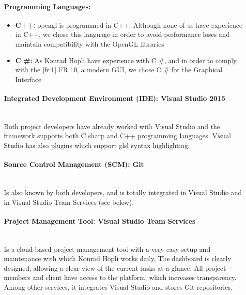\paragraph{Programming Languages:}
\begin{itemize}
	\item[] \textbf{C++:} \gls{opengl} is programmed in C++. Although none of us have experience in C++, we chose this language in order to avoid performance loses and maintain compatibility with the OpenGL libraries
	\item[] \textbf{C \#:} As Konrad H\"opli have experience with C \#, and in order to comply with the \ref{fr:1} FR 10, a modern GUI, we chose C \# for the Graphical Interface
\end{itemize}


\paragraph{Integrated Development Environment (IDE): Visual Studio 2015}
\noindent \\Both project developers have already worked with Visual Studio and the framework supports both C sharp and C++ programming languages. Visual Studio has also plugins which support \gls{glsl} syntax highlighting.

\paragraph{Source Control Management (SCM): Git} 
\noindent \\ Is also known by both developers, and is totally integrated in Visual Studio and in Visual Studio Team Services (see below).

\paragraph{Project Management Tool: Visual Studio Team Services \cite{visualstudioteamservices}}
\noindent \\ Is a cloud-based project management tool with a very easy setup and maintenance with which Konrad H\"opli works daily. The dashboard is clearly designed, allowing a clear view of the current tasks at a glance. All project members and client have access to the platform, which increases transparency. Among other services, it integrates Visual Studio and stores Git repositories.




